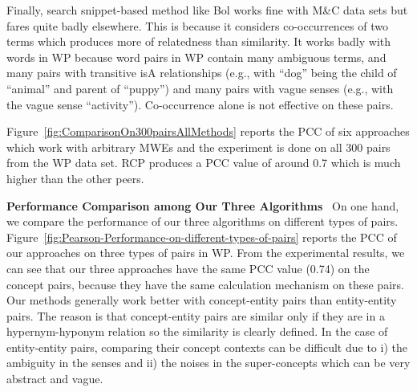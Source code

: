 Finally, search snippet-based method like Bol works fine with M\&C data sets but fares quite badly elsewhere. This is because it considers
co-occurrences of two terms which produces more of relatedness than similarity. It works badly with words in WP because word pairs in WP
contain many ambiguous terms, and many pairs with transitive isA relationships (e.g.,  with ``dog'' being the child of
``animal'' and parent of ``puppy'') and many pairs with vague senses (e.g.,  with the vague sense ``activity'').
Co-occurrence alone is not effective on these pairs.

Figure~\ref{fig:ComparisonOn300pairsAllMethods} reports
the PCC of six approaches which work with arbitrary MWEs and the
experiment is done on all 300 pairs from the WP data set.
RCP produces a PCC value of around 0.7 which is much higher
than the other peers.

\noindent\textbf{Performance Comparison among Our Three Algorithms}~
On one hand, we compare the performance of our three algorithms on different types of pairs.
Figure~\ref{fig:Pearson-Performance-on-different-types-of-pairs} reports the PCC of our approaches on three types of pairs in WP. From the
experimental results, we can see that our three approaches have the same PCC value (0.74) on the concept pairs, because they have the same
calculation mechanism on these pairs. Our methods generally work better with concept-entity pairs than entity-entity pairs. The reason is that
concept-entity pairs are similar only if they are in a hypernym-hyponym relation so the similarity is clearly defined. In the case of
entity-entity pairs, comparing their concept contexts can be difficult due to i) the ambiguity in the senses and ii) the noises in the
super-concepts which can be very abstract and vague.

